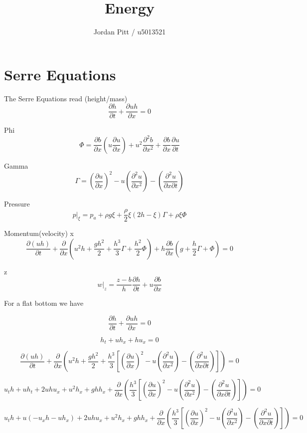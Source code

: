 \documentclass[12pt]{article}
\begin{document}
\title{Energy}
\author{Jordan Pitt / u5013521}

\section{Serre Equations}

The Serre Equations read
(height/mass)
\[\frac{\partial h}{\partial t} + \frac{\partial uh}{\partial x} = 0 \]

Phi
\[\Phi = \frac{\partial b}{\partial x}\left(u \frac{\partial u}{\partial x}\right) + u^2 \frac{\partial^2 b}{\partial x^2} + \frac{\partial b}{\partial x}\frac{\partial u}{\partial t}\]

Gamma
\[\Gamma = \left(\frac{\partial u}{\partial x} \right)^2 - u \left(\frac{\partial^2 u}{\partial x^2} \right) - \left(\frac{\partial^2 u}{\partial x \partial t} \right)\]

Pressure
\[p|_\xi = p_a + \rho g \xi + \frac{\rho}{2}\xi\left(2h - \xi\right)\Gamma + \rho \xi \Phi \]


Momentum(velocity)
x
\[ \frac{\partial (uh)}{\partial t} + \frac{\partial}{\partial x}\left(u^2 h + \frac{gh^2}{2} + \frac{h^3}{3}\Gamma + \frac{h^2}{2} \Phi\right) + h \frac{\partial b}{\partial x}\left(g + \frac{h}{2}\Gamma + \Phi\right) = 0\]

z
\[w|_z = \frac{z - b}{h} \frac{\partial h}{\partial t} + u \frac{\partial b}{\partial x}\]


For a flat bottom we have

\[\frac{\partial h}{\partial t} + \frac{\partial uh}{\partial x} = 0 \]

\[h_t + uh_x + hu_x = 0 \]

\[ \frac{\partial (uh)}{\partial t} + \frac{\partial}{\partial x}\left(u^2 h + \frac{gh^2}{2} + \frac{h^3}{3}\left[\left(\frac{\partial u}{\partial x} \right)^2 - u \left(\frac{\partial^2 u}{\partial x^2} \right) - \left(\frac{\partial^2 u}{\partial x \partial t} \right)\right]\right)  = 0\]

\[u_th + u h_t + 2uhu_x + u^2h_x + ghh_x  + \frac{\partial}{\partial x}\left( \frac{h^3}{3}\left[\left(\frac{\partial u}{\partial x} \right)^2 - u \left(\frac{\partial^2 u}{\partial x^2} \right) - \left(\frac{\partial^2 u}{\partial x \partial t} \right)\right]\right)  = 0\]

\[u_th + u \left(-u_xh - uh_x\right) + 2uhu_x + u^2h_x + ghh_x  + \frac{\partial}{\partial x}\left( \frac{h^3}{3}\left[\left(\frac{\partial u}{\partial x} \right)^2 - u \left(\frac{\partial^2 u}{\partial x^2} \right) - \left(\frac{\partial^2 u}{\partial x \partial t} \right)\right]\right)  = 0\]
\end{document}
